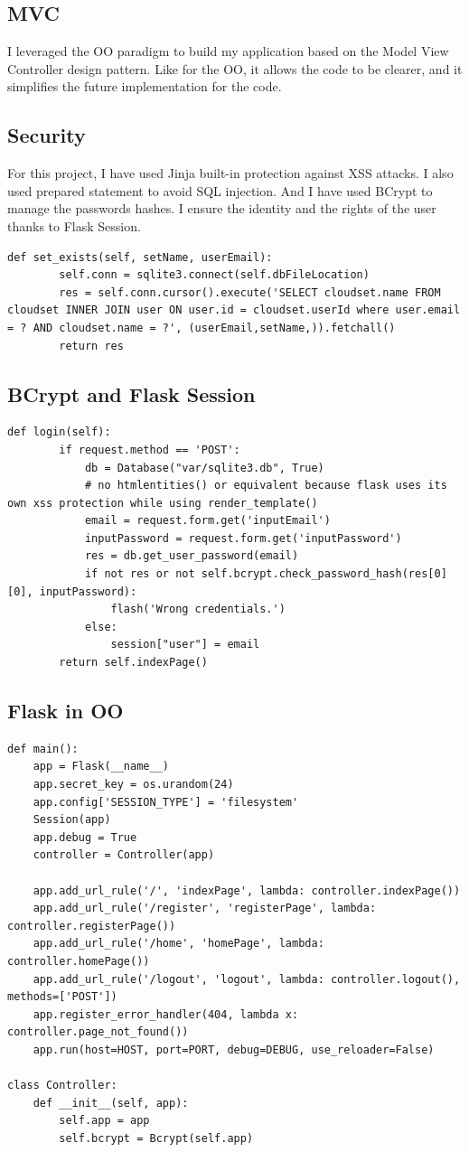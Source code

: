 \documentclass[10pt, a4paper]{article}
\begin{document}
\subsection{MVC}
I leveraged the OO paradigm to build my application based on the Model View Controller design pattern. Like for the OO, it allows the code to be clearer, and it simplifies the future implementation for the code.
\subsection{Security}
For this project, I have used Jinja built-in protection against XSS attacks. I also used prepared statement to avoid SQL injection. And I have used BCrypt to manage the passwords hashes. I ensure the identity and the rights of the user thanks to Flask Session.
\begin{lstlisting}[caption = Query with  SQL parameters]
def set_exists(self, setName, userEmail):
		self.conn = sqlite3.connect(self.dbFileLocation)
		res = self.conn.cursor().execute('SELECT cloudset.name FROM cloudset INNER JOIN user ON user.id = cloudset.userId where user.email = ? AND cloudset.name = ?', (userEmail,setName,)).fetchall()
		return res
\end{lstlisting}
\subsection{BCrypt and Flask Session}
\begin{lstlisting}[caption = Login with BCrypt and Session]
def login(self):
		if request.method == 'POST':
			db = Database("var/sqlite3.db", True)
			# no htmlentities() or equivalent because flask uses its own xss protection while using render_template()
			email = request.form.get('inputEmail')
			inputPassword = request.form.get('inputPassword')
			res = db.get_user_password(email)
			if not res or not self.bcrypt.check_password_hash(res[0][0], inputPassword):
				flash('Wrong credentials.')
			else:
				session["user"] = email
		return self.indexPage()
\end{lstlisting}

\subsection{Flask in OO}
\begin{lstlisting}[caption = Login with BCrypt and Session]
def main():
	app = Flask(__name__)
	app.secret_key = os.urandom(24)
	app.config['SESSION_TYPE'] = 'filesystem'
	Session(app)
	app.debug = True
	controller = Controller(app)

	app.add_url_rule('/', 'indexPage', lambda: controller.indexPage())
	app.add_url_rule('/register', 'registerPage', lambda: controller.registerPage())
	app.add_url_rule('/home', 'homePage', lambda: controller.homePage())
	app.add_url_rule('/logout', 'logout', lambda: controller.logout(), methods=['POST'])
	app.register_error_handler(404, lambda x: controller.page_not_found())
	app.run(host=HOST, port=PORT, debug=DEBUG, use_reloader=False)

class Controller:
	def __init__(self, app):
		self.app = app
		self.bcrypt = Bcrypt(self.app)
\end{lstlisting}
\end{document}
